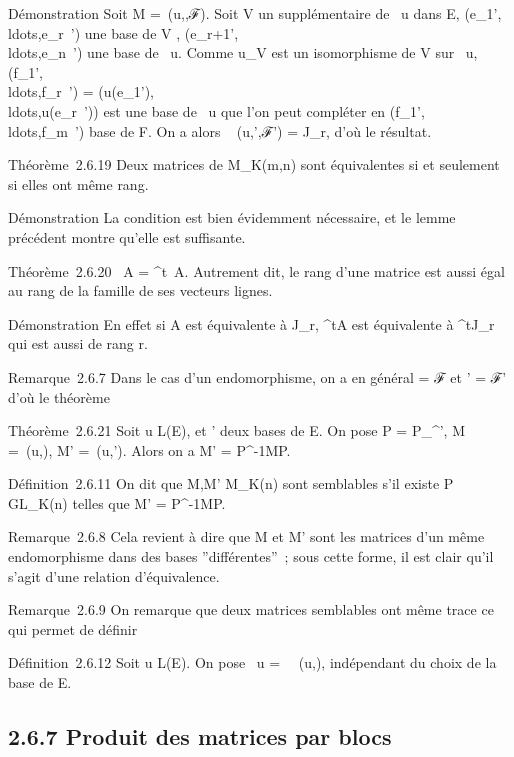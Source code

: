 \documentclass[]{article}
\begin{document}
Démonstration Soit M =\
\mathrmMat (u,,ℱ). Soit V un supplémentaire de
\mathrmKer~u dans E,
(e_1',\\ldots,e_r~')
une base de V ,
(e_r+1',\\ldots,e_n~')
une base de \mathrmKer~u.
Comme u_V  est un isomorphisme de V sur
\mathrmIm~u,
(f_1',\\ldots,f_r~')
=
(u(e_1'),\\ldots,u(e_r~'))
est une base de \mathrmIm~u
que l'on peut compléter en
(f_1',\\ldots,f_m~')
base de F. On a alors
\mathrmMat~ (u,',ℱ') =
J_r, d'où le résultat.

Théorème~2.6.19 Deux matrices de M_K(m,n) sont équivalentes si
et seulement si elles ont même rang.

Démonstration La condition est bien évidemment nécessaire, et le lemme
précédent montre qu'elle est suffisante.

Théorème~2.6.20 \mathrmrg~A
= \mathrmrg^t~A.
Autrement dit, le rang d'une matrice est aussi égal au rang de la
famille de ses vecteurs lignes.

Démonstration En effet si A est équivalente à J_r,
^tA est équivalente à ^tJ_r qui est aussi
de rang r.

Remarque~2.6.7 Dans le cas d'un endomorphisme, on a en général  = ℱ et
\mathcal{E}' = ℱ' d'où le théorème

Théorème~2.6.21 Soit u \in L(E),  et ' deux bases de E. On pose P =
P_\mathcal{E}^\mathcal{E}', M =\
\mathrmMat (u,), M' =\
\mathrmMat (u,\mathcal{E}'). Alors on a M' =
P^-1MP.

Définition~2.6.11 On dit que M,M' \in M_K(n) sont semblables s'il
existe P \in GL_K(n) telles que M' = P^-1MP.

Remarque~2.6.8 Cela revient à dire que M et M' sont les matrices d'un
même endomorphisme dans des bases ''différentes''~; sous cette forme, il
est clair qu'il s'agit d'une relation d'équivalence.

Remarque~2.6.9 On remarque que deux matrices semblables ont même trace
ce qui permet de définir

Définition~2.6.12 Soit u \in L(E). On pose
~u
=\
\mathrm{tr}\mathrmMat~
(u,), indépendant du choix de la base \mathcal{E} de E.

\subsection{2.6.7 Produit des matrices par blocs}
\end{document}

